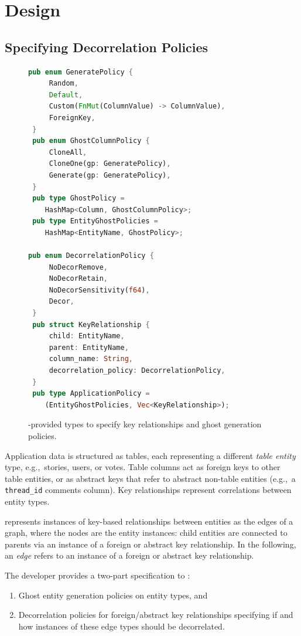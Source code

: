 \section{Design}
\subsection{Specifying Decorrelation Policies}

\begin{figure}
\begin{lstlisting}[language=Rust]
 pub enum GeneratePolicy {
     Random,
     Default,
     Custom(FnMut(ColumnValue) -> ColumnValue),
     ForeignKey, 
 }
 pub enum GhostColumnPolicy {
     CloneAll,
     CloneOne(gp: GeneratePolicy),
     Generate(gp: GeneratePolicy),
 }
 pub type GhostPolicy = 
    HashMap<Column, GhostColumnPolicy>;
 pub type EntityGhostPolicies = 
    HashMap<EntityName, GhostPolicy>;

pub enum DecorrelationPolicy {
     NoDecorRemove,
     NoDecorRetain,
     NoDecorSensitivity(f64),
     Decor,
 }
 pub struct KeyRelationship {
     child: EntityName,
     parent: EntityName,
     column_name: String,
     decorrelation_policy: DecorrelationPolicy,
 }
 pub type ApplicationPolicy = 
    (EntityGhostPolicies, Vec<KeyRelationship>);
\end{lstlisting}
    \caption{\sys{}-provided types to specify key relationships and ghost generation policies.}
\end{figure}

Application data is structured as tables, each representing a different \emph{table entity} type,
e.g.,\ stories, users, or votes. Table columns act as foreign keys to other table entities, or as
abstract keys that refer to abstract non-table entities (e.g.,\ a \texttt{thread\_id} comments column). 
Key relationships represent correlations between entity types.

\sys{} represents instances of key-based relationships between entities as the edges of a graph,
where the nodes are the entity instances: child entities are connected to parents via an instance of
a foreign or abstract key relationship. In the following, an \emph{edge} refers to an instance of a
foreign or abstract key relationship.

The developer provides a two-part specification to \sys{}: 
\begin{enumerate}
    \item Ghost entity generation policies on entity types, and
    \item Decorrelation policies for foreign/abstract key relationships specifying if and how
        instances of these edge types should be decorrelated.
\end{enumerate}

